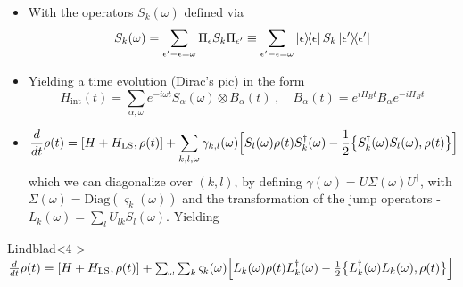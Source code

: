 \documentclass[10pt,xcolor={table,dvipsnames},t]{beamer}
\newcommand{\dt}{\frac{d}{dt}}
\newcommand{\Hint}{H_{\text{int}}}
\newcommand{\outerprod}[2]{\ket{#1}\!\!\bra{#2}}
\begin{document}
\begin{frame}{}
\begin{itemize}
  \item<1-> With the operators $S_k(\omega)$ defined via 
    \begin{equation}
      S_k(\omega) = \sum_{\epsilon' - \epsilon = \omega} \Pi_\epsilon S_k \Pi_{\epsilon'} \equiv \sum_{\epsilon' - \epsilon = \omega}\outerprod{\epsilon}{\epsilon} S_k \outerprod{\epsilon'}{\epsilon'}
    \end{equation}
  \item<2-> Yielding a time evolution (Dirac's pic) in the form 
    \begin{equation}
      \Hint(t) = \sum_{\alpha, \omega} e^{-i\omega t} S_\alpha (\omega) \otimes B_\alpha (t)\;, \quad B_\alpha(t) = e^{iH_B t}B_\alpha e^{-iH_B t}
    \end{equation}
  \item<3-> $$\dt \rho(t) = [H+H_\text{LS}, \rho(t)] + \sum_{k,l, \omega} \gamma_{k,l}(\omega) \Bigl[S_l(\omega)\rho(t)S_k^\dag(\omega) - \frac{1}{2}\bigl\{ S_k^\dag(\omega) S_l(\omega), \rho(t) \bigr\}\Bigr]$$
            which we can diagonalize over $(k,l)$, by defining $\gamma(\omega) = U \varSigma(\omega) U^\dag$, with $\varSigma(\omega) = \text{Diag}(\varsigma_k(\omega))$ and the transformation of 
            the jump operators - $L_k(\omega) = \sum_l U_{lk}S_l(\omega)$. Yielding
\end{itemize}
\begin{block}{Lindblad}<4->
              $\dt \rho(t) = [H+H_\text{LS}, \rho(t)] + \sum_{\omega} \sum_k \varsigma_k(\omega)\Bigl[L_k(\omega)\rho(t)L_k^\dag(\omega) - \frac{1}{2}\bigl\{ L_k^\dag(\omega)L_k(\omega), \rho(t) \bigr\}\Bigr]$
          \end{block}
\end{frame}
\end{document}
